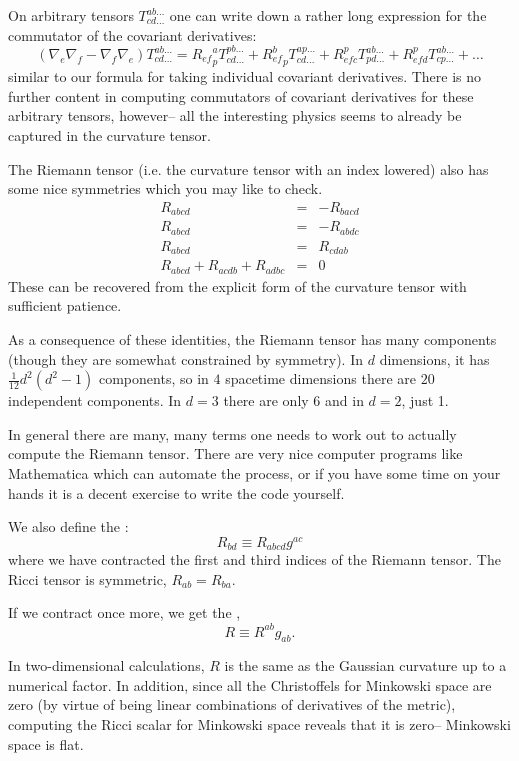 On arbitrary tensors $T^{ab\ldots}_{cd\ldots}$ one can write down a rather long expression for the commutator of the covariant derivatives:
$$(\nabla_e \nabla_f -\nabla_f \nabla_e)T^{ab\ldots}_{cd\ldots} = {R_{ef}}^a_p T^{pb \ldots}_{cd \ldots}+{R_{ef}^b}_p T^{ap\ldots}_{cd \ldots}+ R_{efc}^p T^{ab\ldots}_{pd\ldots} + R_{efd}^p T^{ab\ldots}_{cp\ldots} + \ldots$$
similar to our formula for taking individual covariant derivatives. There is no further content in computing commutators of covariant derivatives for these arbitrary tensors, however-- all the interesting physics seems to already be captured in the curvature tensor.

The Riemann tensor (i.e. the curvature tensor with an index lowered) also has some nice symmetries which you may like to check.
\begin{eqnarray*}
R_{abcd}&=& -R_{bacd}\\
R_{abcd}&=& -R_{abdc}\\
R_{abcd}&=&R_{cdab}\\
R_{abcd}+R_{acdb}+R_{adbc}&=&0
\end{eqnarray*}
These can be recovered from the explicit form of the curvature tensor with sufficient patience.

As a consequence of these identities, the Riemann tensor has many components (though they are somewhat constrained by symmetry). In $d$ dimensions, it has
$\frac{1}{12} d^2(d^2-1)$ components, so in $4$ spacetime dimensions there are $20$ independent components. In $d=3$ there are only $6$ and in $d=2$, just 1.

In general there are many, many terms one needs to work out to actually compute the Riemann tensor. There are very nice computer programs like Mathematica which can automate the process, or if you have some time on your hands it is a decent exercise to write the code yourself.

\begin{defn}
We also define the :
$$R_{bd}\equiv R_{abcd}g^{ac}$$
where we have contracted the first and third indices of the Riemann tensor. The Ricci tensor is symmetric, $R_{ab}=R_{ba}$.
\end{defn}
\begin{defn}
If we contract once more, we get the ,
$$R\equiv R^{ab}g_{ab}.$$
\end{defn}

In two-dimensional calculations, $R$ is the same as the Gaussian curvature up to a numerical factor. 
In addition, since all the Christoffels for Minkowski space are zero (by virtue of being linear combinations of derivatives of the metric), computing the Ricci scalar for Minkowski space reveals that it is zero-- Minkowski space is flat.

